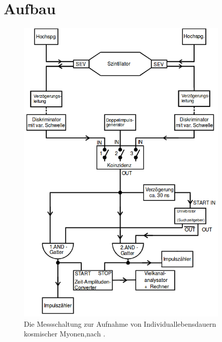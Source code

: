 \section{Aufbau}
\label{sec:Aufbau}
\begin{figure}
    \centering
    \includegraphics[width=0.9\textwidth]{content/images/AufbauV01.png}
    \caption{Die Messschaltung zur Aufnahme von Individuallebensdauern kosmischer Myonen,nach \cite{V01}.}
    \label{fig:Aufbau}
    \end{figure}

